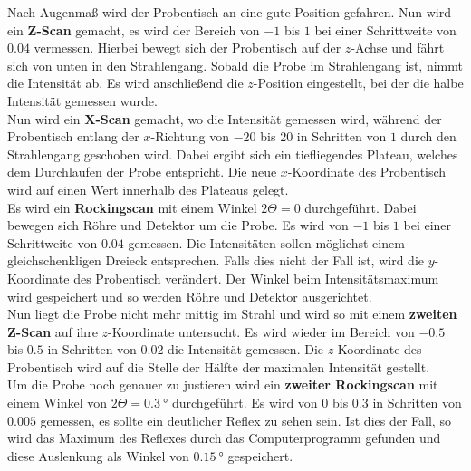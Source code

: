         \noindent Nach Augenmaß wird der Probentisch an eine gute Position gefahren. Nun wird ein \textbf{Z-Scan} gemacht, es wird der Bereich von 
        $\num{-1}$ bis $\num{1}$ bei einer Schrittweite von $\num{0.04}$ vermessen. Hierbei bewegt sich der Probentisch auf der $z$-Achse und fährt 
        sich von unten in den Strahlengang. Sobald die Probe im Strahlengang ist, nimmt die Intensität ab. Es wird anschließend die $z$-Position 
        eingestellt, bei der die halbe Intensität gemessen wurde. \\ 

        \noindent Nun wird ein \textbf{X-Scan} gemacht, wo die Intensität gemessen wird, während der Probentisch entlang der $x$-Richtung von 
        $\num{-20}$ bis $\num{20}$ in Schritten von $\num{1}$ durch den Strahlengang geschoben wird. Dabei ergibt sich ein tiefliegendes Plateau, 
        welches dem Durchlaufen der Probe entspricht. Die neue $x$-Koordinate des Probentisch wird auf einen Wert innerhalb des Plateaus gelegt. \\

        \noindent Es wird ein \textbf{Rockingscan} mit einem Winkel $2 \Theta = \num{0}$ durchgeführt. Dabei bewegen sich Röhre und Detektor um die Probe. 
        Es wird von $\num{-1}$ bis $\num{1}$ bei einer Schrittweite von $\num{0.04}$ gemessen. Die Intensitäten sollen
        möglichst einem gleichschenkligen Dreieck entsprechen. Falls dies nicht der Fall ist, wird die $y$-Koordinate des Probentisch verändert. 
        Der Winkel beim Intensitätsmaximum wird gespeichert und so werden Röhre und Detektor ausgerichtet. \\

        \noindent Nun liegt die Probe nicht mehr mittig im Strahl und wird so mit einem \textbf{zweiten Z-Scan} auf ihre $z$-Koordinate untersucht. 
        Es wird wieder im Bereich von $\num{-0.5}$ bis $\num{0.5}$ in Schritten von $\num{0.02}$ die Intensität gemessen. Die $z$-Koordinate des 
        Probentisch wird auf die Stelle der Hälfte der maximalen Intensität gestellt. \\

        \noindent Um die Probe noch genauer zu justieren wird ein \textbf{zweiter Rockingscan} mit einem Winkel von $2\Theta = \SI{0.3}{\degree}$ 
        durchgeführt. Es wird von $\num{0}$ bis $\num{0.3}$ in Schritten von $\num{0.005}$ gemessen, es sollte ein deutlicher Reflex zu sehen sein. 
        Ist dies der Fall, so wird das Maximum des Reflexes durch das Computerprogramm gefunden und diese Auslenkung als Winkel von 
        $\SI{0.15}{\degree}$ gespeichert. \\

